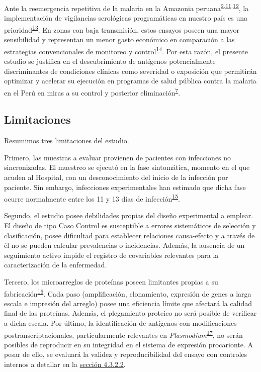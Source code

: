 \documentclass[]{article}
\begin{document}
Ante la reemergencia repetitiva de la malaria en la Amazonia
peruana\textsuperscript{\protect\hyperlink{ref-rosas2016peru}{2},\protect\hyperlink{ref-griffing2013history}{11},\protect\hyperlink{ref-soto2017spatio}{12}},
la implementación de vigilancias serológicas programáticas en nuestro
país es una
prioridad\textsuperscript{\protect\hyperlink{ref-hotspots2015}{13}}. En
zonas con baja transmisión, estos ensayos poseen una mayor sensibilidad
y representan un menor gasto económico en comparación a las estrategias
convencionales de monitoreo y
control\textsuperscript{\protect\hyperlink{ref-elliott2014}{14}}. Por
esta razón, el presente estudio se justifica en el descubrimiento de
antígenos potencialmente discriminantes de condiciones clínicas como
severidad o exposición que permitirán optimizar y acelerar su ejecución
en programas de salud pública contra la malaria en el Perú en miras a su
control y posterior
eliminación\textsuperscript{\protect\hyperlink{ref-accelerate2016}{7}}.

\subsection{Limitaciones}\label{limit}

Resumimos tres limitaciones del estudio.

Primero, las muestras a evaluar provienen de pacientes con infecciones
no sincronizadas. El muestreo se ejecutó en la fase sintomática, momento
en el que acuden al Hospital, con un desconocimiento del inicio de la
infección por paciente. Sin embargo, infecciones experimentales han
estimado que dicha fase ocurre normalmente entre los 11 y 13 días de
infección\textsuperscript{\protect\hyperlink{ref-arevalo2014}{15}}.

Segundo, el estudio posee debilidades propias del diseño experimental a
emplear. El diseño de tipo Caso Control es susceptible a errores
sistemáticos de selección y clasificación, posee dificultad para
establecer relaciones causa-efecto y a través de él no se pueden
calcular prevalencias o incidencias. Además, la ausencia de un
seguimiento activo impide el registro de covariables relevantes para la
caracterización de la enfermedad.

Tercero, los microarreglos de proteínas poseen limitantes propias a su
fabricación\textsuperscript{\protect\hyperlink{ref-vigil2010}{16}}. Cada
paso (amplificación, clonamiento, expresión de genes a larga escala e
impresión del arreglo) posee una eficiencia límite que afectará la
calidad final de las proteínas. Además, el plegamiento proteico no será
posible de verificar a dicha escala. Por último, la identificación de
antígenos con modificaciones postranscriptacionales, particularmente
relevantes en
\emph{Plasmodium}\textsuperscript{\protect\hyperlink{ref-leroch2009postmod}{17}},
no serán posibles de reproducir en su integridad en el sistema de
expresión procarionte. A pesar de ello, se evaluará la validez y
reproducibilidad del ensayo con controles internos a detallar en la
\protect\hyperlink{validez}{sección 4.3.2.2}.
\end{document}
